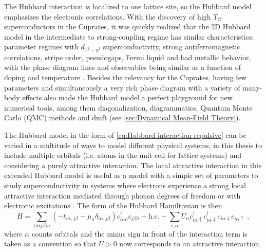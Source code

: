 \documentclass[../main.tex]{subfiles}
\begin{document}
The Hubbard interaction is localized to one lattice site, so the Hubbard model emphasizes the electronic correlations.
With the discovery of high \(T_{\mathrm{C}}\) superconductors in the Cuprates, it was quickly realized that the 2D Hubbard model in the intermediate to strong-coupling regime has similar characteristics: parameter regimes with \(d_{x^2 - y^2}\) superconductivity, strong antiferromagnetic correlations, stripe order, pseudogaps, Fermi liquid and bad metallic behavior, with the phase diagram lines and observables being similar as a function of doping and temperature \cite{arovasHubbardModel2022, qinHubbardModelComputational2022}.
Besides the relevancy for the Cuprates, having few parameters and simultaneously a very rich phase diagram with a variety of many-body effects also made the Hubbard model a perfect playground for new numerical tools, among them diagonalization, diagrammatics, Quantum Monte Carlo (QMC) methods and \gls{dmft} (see \cref{sec:Dynamical Mean-Field Theory}).

The Hubbard model  in the form of \cref{eq:Hubbard interaction repulsive} can be varied in a multitude of ways to model different physical systems, in this thesis to include multiple orbitals (i.e. atoms in the unit cell for lattice systems) and considering a purely attractive interaction.
The local attractive interaction in this extended Hubbard model is useful as a model with a simple set of parameters to study superconductivity in systems where electrons experience a strong local attractive interaction mediated through phonon degrees of freedom or with electronic excitations \cite{micnasSuperconductivityNarrowbandSystems1990}.
The form of the Hubbard Hamiltonian is then
\begin{equation}
	H = \sum_{\langle i \alpha j \beta \rangle \sigma} \left(-t_{i \alpha, j \beta} - \mu_{\sigma} \delta_{i \alpha, j \beta}\right) c_{i \alpha \sigma}^{\dagger} c_{j \beta \sigma} + \mathrm{h.c.} -\sum_{i, \alpha} U_{\alpha} c_{i \alpha \uparrow}^{\dagger} c_{i \alpha \downarrow}^{\dagger} c_{i \alpha \downarrow} c_{i \alpha \uparrow} \;,
	\label{eq:Hubbard interaction multiband}
\end{equation}
where \(\alpha\) counts orbitals and the minus sign in front of the interaction term is taken as a convention so that \(U > 0\) now corresponds to an attractive interaction.
\end{document}
